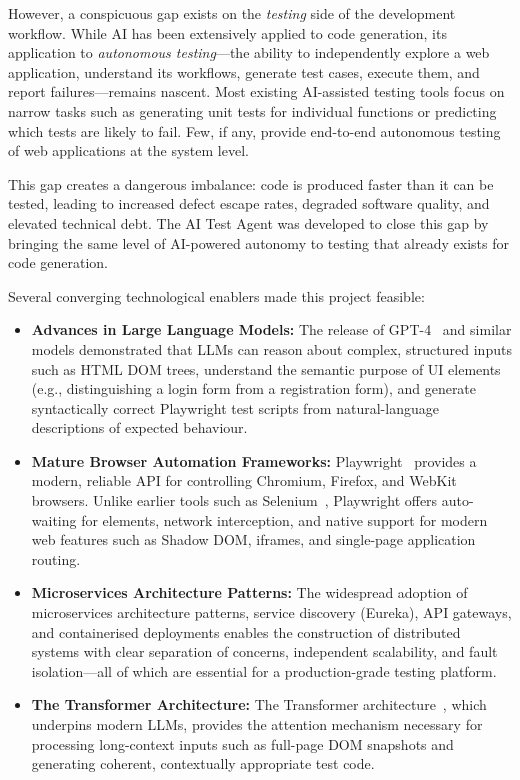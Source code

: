 However, a conspicuous gap exists on the \emph{testing} side of the development workflow. While AI has been extensively applied to code generation, its application to \emph{autonomous testing}---the ability to independently explore a web application, understand its workflows, generate test cases, execute them, and report failures---remains nascent. Most existing AI-assisted testing tools focus on narrow tasks such as generating unit tests for individual functions or predicting which tests are likely to fail. Few, if any, provide end-to-end autonomous testing of web applications at the system level.

This gap creates a dangerous imbalance: code is produced faster than it can be tested, leading to increased defect escape rates, degraded software quality, and elevated technical debt. The AI Test Agent was developed to close this gap by bringing the same level of AI-powered autonomy to testing that already exists for code generation.

Several converging technological enablers made this project feasible:

\begin{itemize}
    \item \textbf{Advances in Large Language Models:} The release of GPT-4~\cite{openai2023gpt4} and similar models demonstrated that LLMs can reason about complex, structured inputs such as HTML DOM trees, understand the semantic purpose of UI elements (e.g., distinguishing a login form from a registration form), and generate syntactically correct Playwright test scripts from natural-language descriptions of expected behaviour.

    \item \textbf{Mature Browser Automation Frameworks:} Playwright~\cite{playwright2024} provides a modern, reliable API for controlling Chromium, Firefox, and WebKit browsers. Unlike earlier tools such as Selenium~\cite{selenium2004}, Playwright offers auto-waiting for elements, network interception, and native support for modern web features such as Shadow DOM, iframes, and single-page application routing.

    \item \textbf{Microservices Architecture Patterns:} The widespread adoption of microservices architecture patterns, service discovery (Eureka), API gateways, and containerised deployments enables the construction of distributed systems with clear separation of concerns, independent scalability, and fault isolation---all of which are essential for a production-grade testing platform.

    \item \textbf{The Transformer Architecture:} The Transformer architecture~\cite{vaswani2017attention}, which underpins modern LLMs, provides the attention mechanism necessary for processing long-context inputs such as full-page DOM snapshots and generating coherent, contextually appropriate test code.
\end{itemize}

